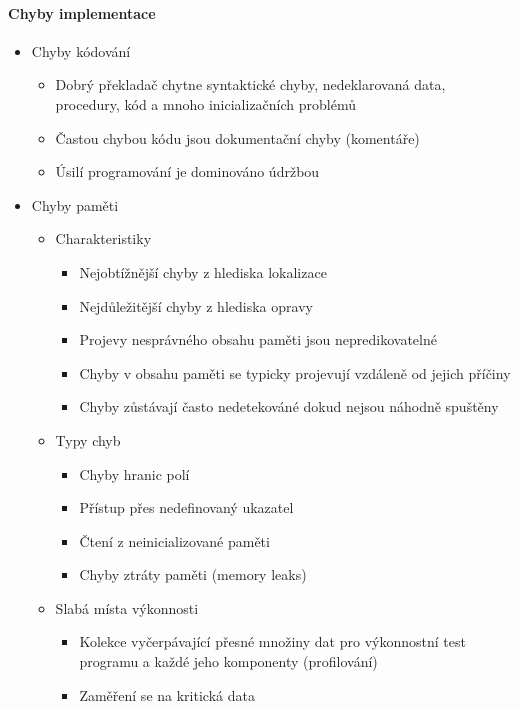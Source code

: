 \paragraph{Chyby implementace}
\begin{itemize}[itemsep=0px]
\item Chyby kódování
    \begin{itemize}[itemsep=0px]
    \item Dobrý překladač chytne syntaktické chyby, nedeklarovaná data, procedury, kód a mnoho inicializačních problémů
    \item Častou chybou kódu jsou dokumentační chyby (komentáře)
    \item Úsilí programování je dominováno údržbou
    \end{itemize}
\item Chyby paměti
    \begin{itemize}[itemsep=0px]
    \item Charakteristiky
        \begin{itemize}[itemsep=0px]
        \item Nejobtížnější chyby z hlediska lokalizace
        \item Nejdůležitější chyby z hlediska opravy
        \item Projevy nesprávného obsahu paměti jsou nepredikovatelné
        \item Chyby v obsahu paměti se typicky projevují vzdáleně od jejich příčiny
        \item Chyby zůstávají často nedetekováné dokud nejsou náhodně spuštěny
        \end{itemize}
    \item Typy chyb
        \begin{itemize}[itemsep=0px]
        \item Chyby hranic polí
        \item Přístup přes nedefinovaný ukazatel
        \item Čtení z neinicializované paměti
        \item Chyby ztráty paměti (memory leaks)
        \end{itemize}
    \item Slabá místa výkonnosti
        \begin{itemize}[itemsep=0px]
        \item Kolekce vyčerpávající přesné množiny dat pro výkonnostní test programu a každé jeho komponenty (profilování)
        \item Zaměření se na kritická data

\end{itemize}
\end{itemize}
\end{itemize}
